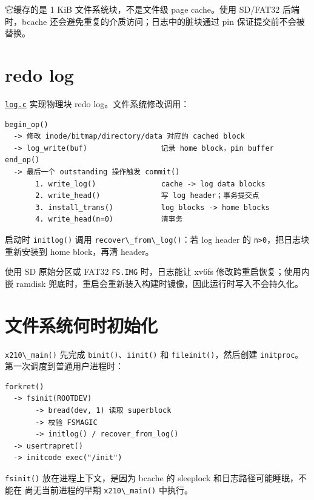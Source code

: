 它缓存的是 1 KiB 文件系统块，不是文件级 page cache。使用 SD/FAT32
后端时，bcache 还会避免重复的介质访问；日志中的脏块通过 pin
保证提交前不会被替换。

\section{redo log}\label{redo-log}

\href{../../../kernel/log.c}{\passthrough{\lstinline!log.c!}} 实现物理块
redo log。文件系统修改调用：

\begin{lstlisting}
begin_op()
  -> 修改 inode/bitmap/directory/data 对应的 cached block
  -> log_write(buf)                 记录 home block，pin buffer
end_op()
  -> 最后一个 outstanding 操作触发 commit()
       1. write_log()               cache -> log data blocks
       2. write_head()              写 log header；事务提交点
       3. install_trans()           log blocks -> home blocks
       4. write_head(n=0)           清事务
\end{lstlisting}

启动时 \passthrough{\lstinline!initlog()!} 调用
\passthrough{\lstinline!recover\_from\_log()!}：若 log header 的
\passthrough{\lstinline!n>0!}，把日志块 重新安装到 home block，再清
header。

使用 SD 原始分区或 FAT32 \passthrough{\lstinline!FS.IMG!} 时，日志能让
xv6fs 修改跨重启恢复；使用内嵌 ramdisk
兜底时，重启会重新装入构建时镜像，因此运行时写入不会持久化。

\section{文件系统何时初始化}\label{ux6587ux4ef6ux7cfbux7edfux4f55ux65f6ux521dux59cbux5316}

\passthrough{\lstinline!x210\_main()!} 先完成
\passthrough{\lstinline!binit()!}、\passthrough{\lstinline!iinit()!} 和
\passthrough{\lstinline!fileinit()!}，然后创建
\passthrough{\lstinline!initproc!}。 第一次调度到普通用户进程时：

\begin{lstlisting}
forkret()
  -> fsinit(ROOTDEV)
       -> bread(dev, 1) 读取 superblock
       -> 校验 FSMAGIC
       -> initlog() / recover_from_log()
  -> usertrapret()
  -> initcode exec("/init")
\end{lstlisting}

\passthrough{\lstinline!fsinit()!} 放在进程上下文，是因为 bcache 的
sleeplock 和日志路径可能睡眠，不能在 尚无当前进程的早期
\passthrough{\lstinline!x210\_main()!} 中执行。

